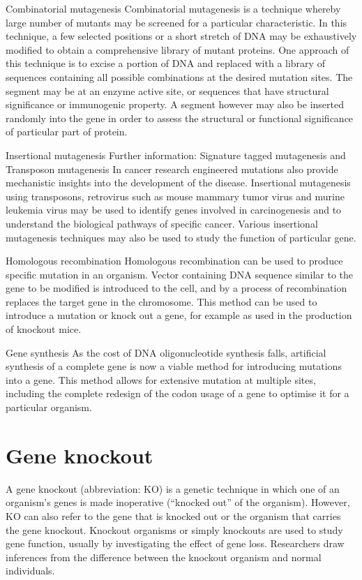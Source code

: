 Combinatorial mutagenesis
Combinatorial mutagenesis is a technique whereby large number of mutants may be screened for a particular characteristic. In this technique, a few selected positions or a short stretch of DNA may be exhaustively modified to obtain a comprehensive library of mutant proteins. One approach of this technique is to excise a portion of DNA and replaced with a library of sequences containing all possible combinations at the desired mutation sites. The segment may be at an enzyme active site, or sequences that have structural significance or immunogenic property. A segment however may also be inserted randomly into the gene in order to assess the structural or functional significance of particular part of protein.

Insertional mutagenesis
Further information: Signature tagged mutagenesis and Transposon mutagenesis
In cancer research engineered mutations also provide mechanistic insights into the development of the disease. Insertional mutagenesis using transposons, retrovirus such as mouse mammary tumor virus and murine leukemia virus may be used to identify genes involved in carcinogenesis and to understand the biological pathways of specific cancer. Various insertional mutagenesis techniques may also be used to study the function of particular gene.

Homologous recombination
Homologous recombination can be used to produce specific mutation in an organism. Vector containing DNA sequence similar to the gene to be modified is introduced to the cell, and by a process of recombination replaces the target gene in the chromosome. This method can be used to introduce a mutation or knock out a gene, for example as used in the production of knockout mice.

Gene synthesis
As the cost of DNA oligonucleotide synthesis falls, artificial synthesis of a complete gene is now a viable method for introducing mutations into a gene. This method allows for extensive mutation at multiple sites, including the complete redesign of the codon usage of a gene to optimise it for a particular organism.

\hypertarget{gene-knockout}{%
\section{Gene knockout}\label{gene-knockout}}

A gene knockout (abbreviation: KO) is a genetic technique in which one of an organism's genes is made inoperative (``knocked out'' of the organism). However, KO can also refer to the gene that is knocked out or the organism that carries the gene knockout. Knockout organisms or simply knockouts are used to study gene function, usually by investigating the effect of gene loss. Researchers draw inferences from the difference between the knockout organism and normal individuals.

